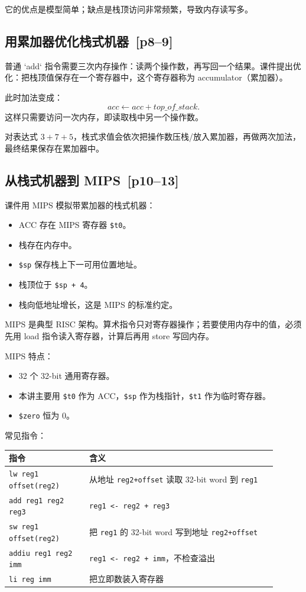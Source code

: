 \documentclass[UTF8,fontset=none,11pt]{ctexart}
\newenvironment{defbox}[1][]{%
  \par\medskip\noindent{\color{defrule}\rule{\linewidth}{1.1pt}}\par\nopagebreak
  \noindent{\bfseries\color{defrule}#1}\par\nopagebreak\smallskip}%
  {\par\nopagebreak\smallskip\noindent{\color{defrule}\rule{\linewidth}{0.4pt}}\par\medskip}
\newcommand{\pg}[1]{\texorpdfstring{{\small\color{graytext}\,[p#1]}}{ [p#1]}}
\begin{document}
它的优点是模型简单；缺点是栈顶访问非常频繁，导致内存读写多。

\subsection{用累加器优化栈式机器 \pg{8--9}}

普通 `add` 指令需要三次内存操作：读两个操作数，再写回一个结果。课件提出优化：把栈顶值保存在一个寄存器中，这个寄存器称为 accumulator（累加器）。

此时加法变成：
\[
acc \leftarrow acc + top\_of\_stack.
\]
这样只需要访问一次内存，即读取栈中另一个操作数。

对表达式 \(3+7+5\)，栈式求值会依次把操作数压栈/放入累加器，再做两次加法，最终结果保存在累加器中。

\subsection{从栈式机器到 MIPS \pg{10--13}}

课件用 MIPS 模拟带累加器的栈式机器：

\begin{itemize}
  \item ACC 存在 MIPS 寄存器 \texttt{\$t0}。
  \item 栈存在内存中。
  \item \texttt{\$sp} 保存栈上下一可用位置地址。
  \item 栈顶位于 \texttt{\$sp + 4}。
  \item 栈向低地址增长，这是 MIPS 的标准约定。
\end{itemize}

\begin{defbox}[MIPS]
MIPS 是典型 RISC 架构。算术指令只对寄存器操作；若要使用内存中的值，必须先用 load 指令读入寄存器，计算后再用 store 写回内存。
\end{defbox}

MIPS 特点：

\begin{itemize}
  \item 32 个 32-bit 通用寄存器。
  \item 本讲主要用 \texttt{\$t0} 作为 ACC，\texttt{\$sp} 作为栈指针，\texttt{\$t1} 作为临时寄存器。
  \item \texttt{\$zero} 恒为 0。
\end{itemize}

常见指令：

\begin{longtable}{L{0.27\linewidth}L{0.63\linewidth}}
\toprule
指令 & 含义 \\
\midrule
\texttt{lw reg1 offset(reg2)} & 从地址 \texttt{reg2+offset} 读取 32-bit word 到 \texttt{reg1} \\
\texttt{add reg1 reg2 reg3} & \texttt{reg1 <- reg2 + reg3} \\
\texttt{sw reg1 offset(reg2)} & 把 \texttt{reg1} 的 32-bit word 写到地址 \texttt{reg2+offset} \\
\texttt{addiu reg1 reg2 imm} & \texttt{reg1 <- reg2 + imm}，不检查溢出 \\
\texttt{li reg imm} & 把立即数装入寄存器 \\
\bottomrule
\end{longtable}
\end{document}
